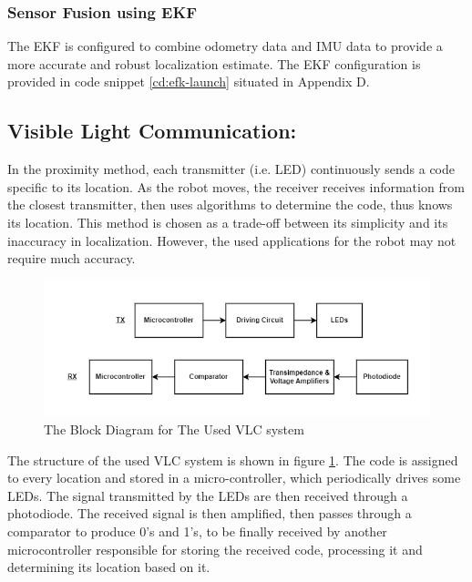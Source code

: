 \subsubsection{Sensor Fusion using EKF}
The EKF is configured to combine odometry data and IMU data to provide a more accurate and robust localization estimate. The EKF configuration is provided in code snippet \ref{cd:efk-launch} situated in Appendix D.

\newpage

\subsection{Visible Light Communication:}
In the proximity method, each transmitter (i.e. LED) continuously sends a code specific to its location. As the robot moves, the receiver receives information from the closest transmitter, then uses algorithms to determine the code, thus knows its location. This method is chosen as a trade-off between its simplicity and its inaccuracy in localization. However, the used applications for the robot may not require much accuracy.
\cite{vlp} \cite{indoor-vlp}

\begin{figure}[h!]
	\centering
	\includegraphics[scale=0.5]{Figures/HW/VLC-blk.png}
	\caption{The Block Diagram for The Used VLC system}
	\label{fig:hw-vlc-blk}
\end{figure}

The structure of the used VLC system is shown in figure \ref{fig:hw-vlc-blk}. The code is assigned to every location and stored in a micro-controller, which periodically drives some LEDs. The signal transmitted by the LEDs are then received through a photodiode. The received signal is then amplified, then passes through a comparator to produce 0's and 1's, to be finally received by another microcontroller responsible for storing the received code, processing it and determining its location based on it.

